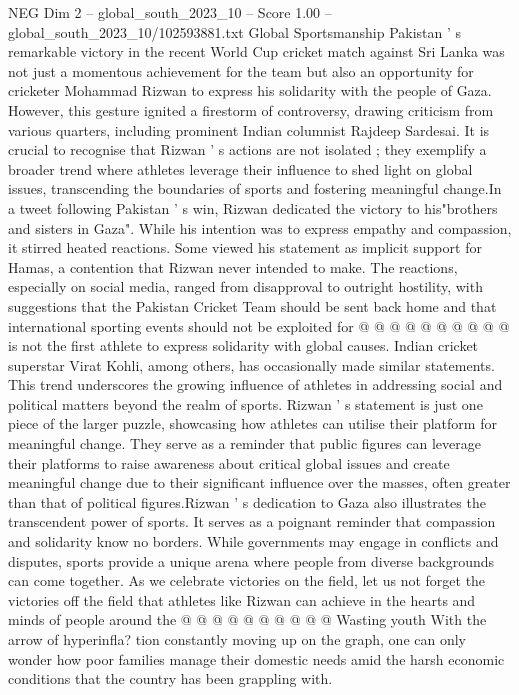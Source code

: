 \begin{textsample}{NEG Dim 2 – global\_south\_2023\_10 – Score 1.00 – global\_south\_2023\_10/102593881.txt}  \label{ex:f2_neg_387}
Global Sportsmanship Pakistan ' s remarkable victory in the recent World Cup cricket match against Sri Lanka was not just a momentous achievement for the team but also an opportunity for cricketer Mohammad Rizwan to express his solidarity with the people of Gaza.
However, this gesture ignited a firestorm of controversy, drawing criticism from various quarters, including prominent Indian columnist Rajdeep Sardesai.
It is crucial to recognise that Rizwan ' s actions are not isolated ; they exemplify a broader trend where athletes leverage their influence to shed light on global issues, transcending the boundaries of sports and fostering meaningful change.In a tweet following Pakistan ' s win, Rizwan dedicated the victory to his"brothers and sisters in Gaza".
While his intention was to express empathy and compassion, it stirred heated reactions.
Some viewed his statement as implicit support for Hamas, a contention that Rizwan never intended to make.
The reactions, especially on social media, ranged from disapproval to outright hostility, with suggestions that the Pakistan Cricket Team should be sent back home and that international sporting events should not be exploited for @ @ @ @ @ @ @ @ @ @ is not the first athlete to express solidarity with global causes.
Indian cricket superstar Virat Kohli, among others, has occasionally made similar statements.
This trend underscores the growing influence of athletes in addressing social and political matters beyond the realm of sports.
Rizwan ' s statement is just one piece of the larger puzzle, showcasing how athletes can utilise their platform for meaningful change.
They serve as a reminder that public figures can leverage their platforms to raise awareness about critical global issues and create meaningful change due to their significant influence over the masses, often greater than that of political figures.Rizwan ' s dedication to Gaza also illustrates the transcendent power of sports.
It serves as a poignant reminder that compassion and solidarity know no borders.
While governments may engage in conflicts and disputes, sports provide a unique arena where people from diverse backgrounds can come together.
As we celebrate victories on the field, let us not forget the victories off the field that athletes like Rizwan can achieve in the hearts and minds of people around the @ @ @ @ @ @ @ @ @ @ Wasting youth With the arrow of hyperinfla? tion constantly moving up on the graph, one can only wonder how poor families manage their domestic needs amid the harsh economic conditions that the country has been grappling with.

\end{textsample}
